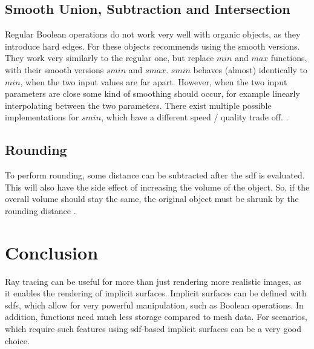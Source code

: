 \subsection{Smooth Union, Subtraction and Intersection}
Regular Boolean operations do not work very well with organic objects, as they introduce hard edges. For these objects  \textcite{quilez:2008:distfunctions} recommends using  the smooth versions. They work very similarly to the regular one, but replace $min$ and $max$ functions, with their smooth versions $smin$ and $smax$. $smin$ behaves (almost) identically to $min$, when the two input values are far apart. However, when the two input parameters are close some kind of smoothing should occur, for example linearly interpolating between the two parameters. There exist multiple possible implementations for $smin$, which have a different speed / quality trade off. 
\cite{quilez:2008:distfunctions, quilez:2008:smoothmin}.

\subsection{Rounding}
To perform rounding, some distance can be subtracted after the \gls{sdf} is evaluated. This will also have the side effect of increasing the volume of the object. So, if the overall volume should stay the same, the original object must be shrunk by the rounding distance \cite{quilez:2008:distfunctions}.

\section{Conclusion}
Ray tracing can be useful for more than just rendering more realistic images, as it enables the rendering of implicit surfaces. Implicit surfaces can be defined with \glspl{sdf}, which allow for very powerful manipulation, such as Boolean operations. In addition, functions need much less storage compared to mesh data. For scenarios, which require such features using \gls{sdf}-based implicit surfaces can be a very good choice.













